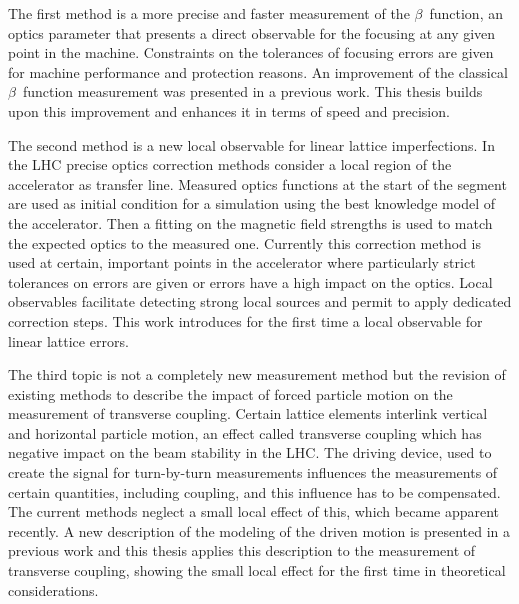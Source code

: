 The first method is a more precise and faster 
measurement of the $\beta$~function, an optics parameter that presents a direct observable for the
focusing at any given point in the machine. Constraints on the tolerances of focusing errors are given
for machine performance and protection reasons. An improvement of the classical $\beta$~function measurement
was presented in a previous work. This thesis builds upon this improvement and enhances it in terms of speed
and precision.

The second method is a new local observable for linear lattice imperfections.
In the LHC precise optics correction
methods consider a local region of the accelerator as transfer line. Measured optics functions at the start
of the segment are used as initial condition for a simulation using the best knowledge model of the accelerator.
Then a fitting on the magnetic field strengths is used to match the expected optics to the measured one.
Currently this correction method is used at certain, important points in the accelerator where particularly
strict tolerances on errors are given or errors have a high impact on the optics.
Local observables facilitate detecting strong local sources and permit to apply dedicated correction steps.
This work introduces for the first time a local observable for linear lattice errors.

The third topic is not a completely new measurement method but the revision of existing methods
to describe the impact of forced particle motion on the measurement of transverse coupling.
Certain lattice elements interlink vertical and horizontal particle motion, an effect called
transverse coupling which has negative impact on the beam stability in the LHC.
The driving device, used to create the signal for turn-by-turn measurements influences
the measurements of certain quantities, including coupling, and this influence has to be compensated.
The current methods neglect a small local effect of this, which became apparent recently.
A new description of the modeling of the driven motion is presented in a previous work and this
thesis applies this description to the measurement of transverse coupling, showing the small local
effect for the first time in theoretical considerations.



